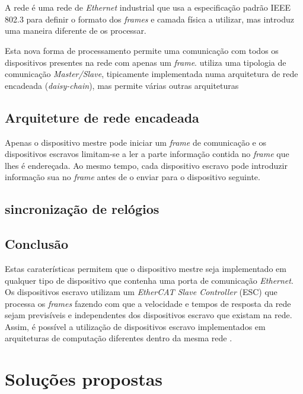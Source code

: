 \section{\ecat}\label{sec:ethercat}

A rede \ecat é uma rede de \emph{Ethernet} industrial que usa a
especificação padrão IEEE 802.3 \cite[]{ieee:IEEEStandardEthernet} para
definir o formato dos \emph{frames} e camada física a utilizar, mas
introduz uma maneira diferente de os processar.

Esta nova forma de processamento permite uma comunicação com todos os
dispositivos presentes na rede com apenas um \emph{frame}. \ecat utiliza
uma tipologia de comunicação \emph{Master/Slave}, tipicamente implementada
numa arquitetura de rede encadeada (\emph{daisy-chain}), mas permite várias
outras arquiteturas %

\subsection{Arquiteture de rede encadeada}
Apenas o dispositivo mestre pode iniciar um \emph{frame} de comunicação
e os dispositivos escravos limitam-se a ler a parte informação contida
no \emph{frame} que lhes é endereçada. Ao mesmo tempo, cada dispositivo
escravo pode introduzir informação sua  no \emph{frame} antes de o enviar
para o dispositivo seguinte.

\subsection{sincronização de relógios}


\subsection{Conclusão}
Estas caraterísticas permitem que o dispositivo mestre seja implementado
em qualquer tipo de dispositivo que contenha uma porta de comunicação 
\emph{Ethernet}. Os dispositivos escravo utilizam um \emph{EtherCAT Slave
Controller} (ESC) que processa os \emph{frames} fazendo com que a velocidade
e tempos de resposta da rede sejam previsíveis e independentes dos 
dispositivos escravo que existam na rede. Assim, é possível a utilização
de dispositivos escravo implementados em arquiteturas de computação
diferentes dentro da mesma rede \ecat.


\section{Soluções propostas} \label{sec:solution}

